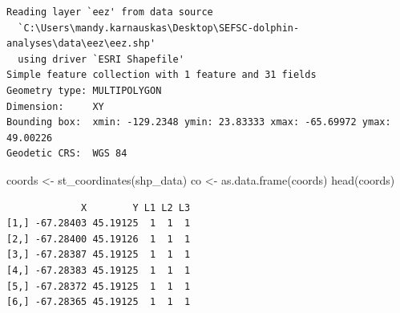 \documentclass[
]{article}
\newenvironment{Shaded}{\begin{snugshade}}{\end{snugshade}}
\newcommand{\FunctionTok}[1]{\textcolor[rgb]{0.28,0.35,0.67}{#1}}
\newcommand{\NormalTok}[1]{\textcolor[rgb]{0.00,0.23,0.31}{#1}}
\newcommand{\OtherTok}[1]{\textcolor[rgb]{0.00,0.23,0.31}{#1}}
\begin{document}
\begin{verbatim}
Reading layer `eez' from data source 
  `C:\Users\mandy.karnauskas\Desktop\SEFSC-dolphin-analyses\data\eez\eez.shp' 
  using driver `ESRI Shapefile'
Simple feature collection with 1 feature and 31 fields
Geometry type: MULTIPOLYGON
Dimension:     XY
Bounding box:  xmin: -129.2348 ymin: 23.83333 xmax: -65.69972 ymax: 49.00226
Geodetic CRS:  WGS 84
\end{verbatim}

\begin{Shaded}
\begin{Highlighting}[]
\NormalTok{coords }\OtherTok{\textless{}{-}} \FunctionTok{st\_coordinates}\NormalTok{(shp\_data)}
\NormalTok{co }\OtherTok{\textless{}{-}} \FunctionTok{as.data.frame}\NormalTok{(coords)}
\FunctionTok{head}\NormalTok{(coords)}
\end{Highlighting}
\end{Shaded}

\begin{verbatim}
             X        Y L1 L2 L3
[1,] -67.28403 45.19125  1  1  1
[2,] -67.28400 45.19126  1  1  1
[3,] -67.28387 45.19125  1  1  1
[4,] -67.28383 45.19125  1  1  1
[5,] -67.28372 45.19125  1  1  1
[6,] -67.28365 45.19125  1  1  1
\end{verbatim}
\end{document}
